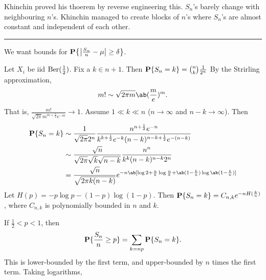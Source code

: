 Khinchin proved his thoerem by reverse engineering this.
$S_n$'s barely change with neighbouring $n$'s.
Khinchin managed to create blocks of $n$'s where $S_n$'s are almost constant
and independent of each other.
    \vspace{1em} \hrule \vspace{1em}
We want bounds for $\P\set*{\abs*{\frac{S_n}n - \mu} \ge \delta}$.
\begin{example}
    Let $X_i$ be iid $\operatorname{Ber}(\frac12)$.
    Fix a $k \in n+1$.
    Then $\operatorname{\mathbf P}\{S_n = k\} = \binom nk \frac1{2^n}$
    By the Strirling approximation, \[
        m! \sim \sqrt{2\pi m} \ab(\frac me)^m.
    \] That is, $\frac{m!}{\sqrt{2\pi} m^{m+\frac12} e^{-m}} \to 1$.
    Assume $1 \ll k \ll n$ ($n \to \infty$ and $n-k \to \infty$).
    Then \begin{align*}
        \P\set{S_n = k} &\sim \frac1{\sqrt{2\pi} 2^n}
            \frac{n^{n+\frac12} e^{-n}}
                {k^{k+\frac12} e^{-k} (n-k)^{n-k+\frac12} e^{-(n-k)}} \\
            &\sim \frac{\sqrt n}{\sqrt{2\pi} \sqrt k \sqrt{n-k}}
                \frac{n^n}{k^k (n-k)^{n-k} 2^n} \\
            &= \frac{\sqrt n}{\sqrt{2\pi k(n-k)}}
                e^{-n\ab[\log 2 + \frac nk \log \frac nk +
                    \ab(1-\frac kn) \log \ab(1-\frac kn)]}
    \end{align*}
    Let $H(p) = -p\log p - (1-p)\log(1-p)$.
    Then $\operatorname{\mathbf P}\{S_n = k\} = C_{n,k} e^{-n H(\frac kn)}$, where $C_{n,k}$
    is polynomially bounded in $n$ and $k$.

    If $\frac12 < p < 1$, then \[
        \operatorname{\mathbf P}\{\frac{S_n}n \ge p\} = \sum_{k=np} \operatorname{\mathbf P}\{S_n = k\}.
    \] This is lower-bounded by the first term, and upper-bounded by
    $n$ times the first term.
    Taking logarithms, 
\end{example}
